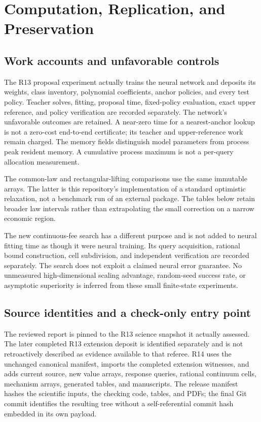 \section{Computation, Replication, and Preservation}
\subsection{Work accounts and unfavorable controls}
The R13 proposal experiment actually trains the neural network and deposits its weights, class inventory, polynomial coefficients, anchor policies, and every test policy. Teacher solves, fitting, proposal time, fixed-policy evaluation, exact upper reference, and policy verification are recorded separately. The network's unfavorable outcomes are retained. A near-zero time for a nearest-anchor lookup is not a zero-cost end-to-end certificate; its teacher and upper-reference work remain charged. The memory fields distinguish model parameters from process peak resident memory. A cumulative process maximum is not a per-query allocation measurement.

The common-law and rectangular-lifting comparisons use the same immutable arrays. The latter is this repository's implementation of a standard optimistic relaxation, not a benchmark run of an external package. The tables below retain broader law intervals rather than extrapolating the small correction on a narrow economic region.



The new continuous-fee search has a different purpose and is not added to neural fitting time as though it were neural training. Its query acquisition, rational bound construction, cell subdivision, and independent verification are recorded separately. The search does not exploit a claimed neural error guarantee. No unmeasured high-dimensional scaling advantage, random-seed success rate, or asymptotic superiority is inferred from these small finite-state experiments.

\subsection{Source identities and a check-only entry point}
The reviewed report is pinned to the R13 science snapshot it actually assessed. The later completed R13 extension deposit is identified separately and is not retroactively described as evidence available to that referee. R14 uses the unchanged canonical manifest, imports the completed extension witnesses, and adds current source, new value arrays, response queries, rational continuum cells, mechanism arrays, generated tables, and manuscripts. The release manifest hashes the scientific inputs, the checking code, tables, and PDFs; the final Git commit identifies the resulting tree without a self-referential commit hash embedded in its own payload.

